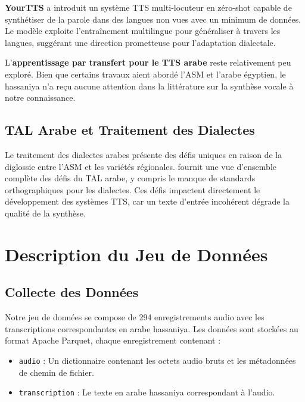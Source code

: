 \documentclass[12pt,a4paper]{article}
\begin{document}
\textbf{YourTTS} \citep{casanova2022yourtts} a introduit un système TTS multi-locuteur en zéro-shot capable de synthétiser de la parole dans des langues non vues avec un minimum de données. Le modèle exploite l'entraînement multilingue pour généraliser à travers les langues, suggérant une direction prometteuse pour l'adaptation dialectale.

L'\textbf{apprentissage par transfert pour le TTS arabe} reste relativement peu exploré. Bien que certains travaux aient abordé l'ASM et l'arabe égyptien, le hassaniya n'a reçu aucune attention dans la littérature sur la synthèse vocale à notre connaissance.

\subsection{TAL Arabe et Traitement des Dialectes}

Le traitement des dialectes arabes présente des défis uniques en raison de la diglossie entre l'ASM et les variétés régionales. \citet{habash2010introduction} fournit une vue d'ensemble complète des défis du TAL arabe, y compris le manque de standards orthographiques pour les dialectes. Ces défis impactent directement le développement des systèmes TTS, car un texte d'entrée incohérent dégrade la qualité de la synthèse.

\section{Description du Jeu de Données}
\label{sec:dataset}

\subsection{Collecte des Données}

Notre jeu de données se compose de 294 enregistrements audio avec les transcriptions correspondantes en arabe hassaniya. Les données sont stockées au format Apache Parquet, chaque enregistrement contenant :

\begin{itemize}
    \item \texttt{audio} : Un dictionnaire contenant les octets audio bruts et les métadonnées de chemin de fichier.
    \item \texttt{transcription} : Le texte en arabe hassaniya correspondant à l'audio.
\end{itemize}
\end{document}
